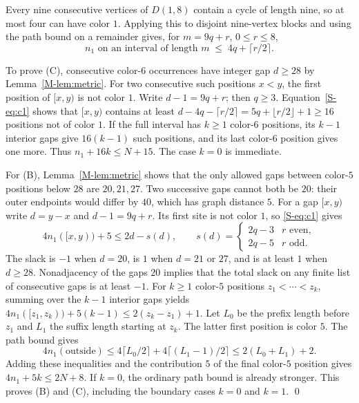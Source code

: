 \documentclass[11pt,reqno]{amsart}
\theoremstyle{plain}
\newcommand{\D}[1]{D(1,#1)}
\theoremstyle{plain}
\theoremstyle{plain}
\begin{document}
Every nine consecutive vertices of $\D{8}$ contain a cycle of length nine, so
at most four can have color $1$. Applying this to disjoint nine-vertex blocks
and using the path bound on a remainder gives, for $m = 9q + r$,
$0 \le r \le 8$,
\begin{equation}\label{S-eq:c1}
n_1 \text{ on an interval of length } m \;\le\; 4q + \lceil r/2 \rceil .
\end{equation}

To prove (C), consecutive color-$6$ occurrences have integer gap $d \ge 28$ by
Lemma~\ref*{M-lem:metric}. For two consecutive such positions $x < y$, the first
position of $[x,y)$ is not color $1$. Write $d-1 = 9q + r$; then $q \ge 3$.
Equation~\eqref{S-eq:c1} shows that $[x,y)$ contains at least
$d - 4q - \lceil r/2 \rceil = 5q + \lfloor r/2 \rfloor + 1 \ge 16$
positions not of color $1$. If the full interval has $k \ge 1$ color-$6$
positions, its $k-1$ interior gaps give $16(k-1)$ such positions, and its last
color-$6$ position gives one more. Thus $n_1 + 16k \le N + 15$. The case
$k = 0$ is immediate.

For (B), Lemma~\ref*{M-lem:metric} shows that the only allowed gaps between
color-$5$ positions below $28$ are $20, 21, 27$. Two successive gaps cannot
both be $20$: their outer endpoints would differ by $40$, which has graph
distance $5$. For a gap $[x,y)$ write $d = y-x$ and $d-1 = 9q+r$. Its first
site is not color $1$, so \eqref{S-eq:c1} gives
\[
4 n_1([x,y)) + 5 \le 2d - s(d), \qquad
s(d) = \begin{cases} 2q-3 & r \text{ even},\\ 2q-5 & r \text{ odd}.\end{cases}
\]
The slack is $-1$ when $d = 20$, is $1$ when $d = 21$ or $27$, and is at least
$1$ when $d \ge 28$. Nonadjacency of the gaps $20$ implies that the total slack
on any finite list of consecutive gaps is at least $-1$. For $k \ge 1$
color-$5$ positions $z_1 < \cdots < z_k$, summing over the $k-1$ interior gaps
yields $4 n_1([z_1,z_k)) + 5(k-1) \le 2(z_k - z_1) + 1$.
Let $L_0$ be the prefix length before $z_1$ and $L_1$ the suffix length
starting at $z_k$. The latter first position is color $5$. The path bound gives
\[
4 n_1(\text{outside}) \le 4\lceil L_0/2 \rceil
   + 4\lceil (L_1-1)/2 \rceil \le 2(L_0 + L_1) + 2 .
\]
Adding these inequalities and the contribution $5$ of the final color-$5$
position gives $4n_1 + 5k \le 2N + 8$. If $k = 0$, the ordinary path bound is
already stronger. This proves (B) and (C), including the boundary cases
$k = 0$ and $k = 1$. \qed
\end{document}
